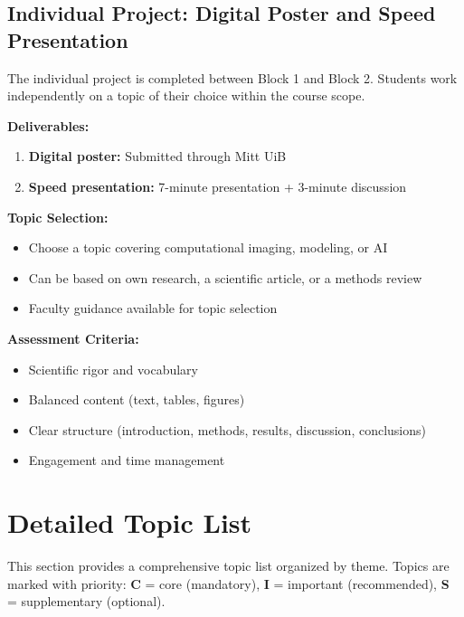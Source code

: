 \documentclass[11pt,a4paper]{article}
\begin{document}
\subsection{Individual Project: Digital Poster and Speed Presentation}

The individual project is completed between Block 1 and Block 2. Students work independently on a topic of their choice within the course scope.

\textbf{Deliverables:}
\begin{enumerate}[nosep]
    \item \textbf{Digital poster:} Submitted through Mitt UiB
    \item \textbf{Speed presentation:} 7-minute presentation + 3-minute discussion
\end{enumerate}

\textbf{Topic Selection:}
\begin{itemize}[nosep]
    \item Choose a topic covering computational imaging, modeling, or AI
    \item Can be based on own research, a scientific article, or a methods review
    \item Faculty guidance available for topic selection
\end{itemize}

\textbf{Assessment Criteria:}
\begin{itemize}[nosep]
    \item Scientific rigor and vocabulary
    \item Balanced content (text, tables, figures)
    \item Clear structure (introduction, methods, results, discussion, conclusions)
    \item Engagement and time management
\end{itemize}

\section{Detailed Topic List}

This section provides a comprehensive topic list organized by theme. Topics are marked with priority: \textbf{C} = core (mandatory), \textbf{I} = important (recommended), \textbf{S} = supplementary (optional).
\end{document}
